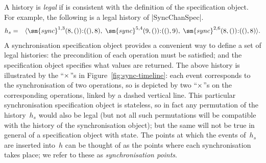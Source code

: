 A history is \emph{legal} if is consistent with the definition of the
specification object.
%
For example, the following is a legal history of |SyncChanSpec|.
\begin{eqnarray*}
h_s & = & 
\seq{
 \sm{sync}^{1,3}(8,()) \:: ((), 8), \;
 \sm{sync}^{5,4}(9,()) \:: ((), 9), \;
 \sm{sync}^{2,6}(8,()) \:: ((), 8) } .
\end{eqnarray*}
%
A synchronisation specification object provides a convenient way to define a
set of legal histories: the precondition of each operation must be satisfied;
and the specification object specifies what values are returned.
%
The above history is illustrated by the ``$\times$''s in
Figure~\ref{fig:sync-timeline}: each event corresponds to the synchronisation
of two operations, so is depicted by two ``$\times$''s on the corresponding
operations, linked by a dashed vertical line.
%
This particular synchronisation specification object is stateless, so in fact
any permutation of the history~$h_s$ would also be legal (but not all such
permutations will be compatible with the history of the synchronisation
object); but the same will not be true in general of a specification object
with state.
%
The points at which the events of~$h_s$ are inserted into~$h$ can be thought
of as the points where each synchronisation takes place; we refer to these as
\emph{synchronisation points}. 

